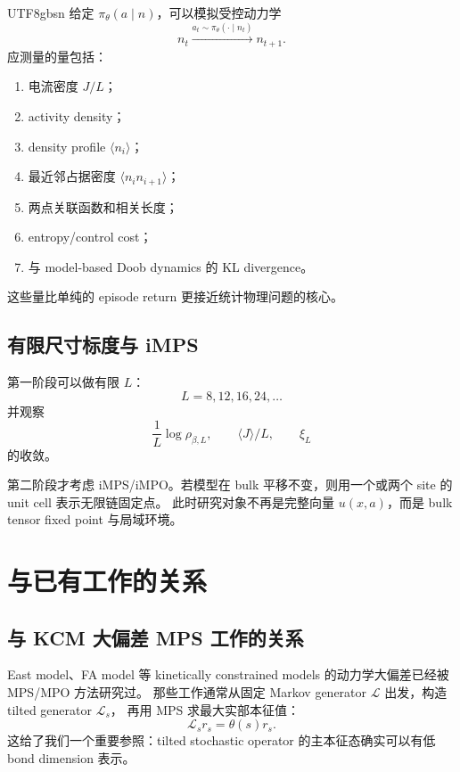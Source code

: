 \documentclass[11pt]{article}
\begin{document}
\begin{CJK*}{UTF8}{gbsn}
给定 \(\pi_\theta(a\mid n)\)，可以模拟受控动力学
\begin{equation}
    n_t\xrightarrow{a_t\sim\pi_\theta(\cdot\mid n_t)}n_{t+1}.
\end{equation}
应测量的量包括：
\begin{enumerate}
    \item 电流密度 \(J/L\)；
    \item activity density；
    \item density profile \(\langle n_i\rangle\)；
    \item 最近邻占据密度 \(\langle n_i n_{i+1}\rangle\)；
    \item 两点关联函数和相关长度；
    \item entropy/control cost；
    \item 与 model-based Doob dynamics 的 KL divergence。
\end{enumerate}
这些量比单纯的 episode return 更接近统计物理问题的核心。

\subsection{有限尺寸标度与 iMPS}

第一阶段可以做有限 \(L\)：
\begin{equation}
    L=8,12,16,24,\dots
\end{equation}
并观察
\begin{equation}
    \frac{1}{L}\log\rho_{\beta,L},
    \qquad
    \langle J\rangle/L,
    \qquad
    \xi_L
\end{equation}
的收敛。

第二阶段才考虑 iMPS/iMPO。若模型在 bulk 平移不变，则用一个或两个 site 的 unit cell 表示无限链固定点。
此时研究对象不再是完整向量 \(u(x,a)\)，而是 bulk tensor fixed point 与局域环境。

\section{与已有工作的关系}

\subsection{与 KCM 大偏差 MPS 工作的关系}

East model、FA model 等 kinetically constrained models 的动力学大偏差已经被 MPS/MPO 方法研究过。
那些工作通常从固定 Markov generator \(\mathcal L\) 出发，构造 tilted generator \(\mathcal L_s\)，
再用 MPS 求最大实部本征值：
\begin{equation}
    \mathcal L_s r_s=\theta(s)r_s.
\end{equation}
这给了我们一个重要参照：tilted stochastic operator 的主本征态确实可以有低 bond dimension 表示。


\end{CJK*}
\end{document}
